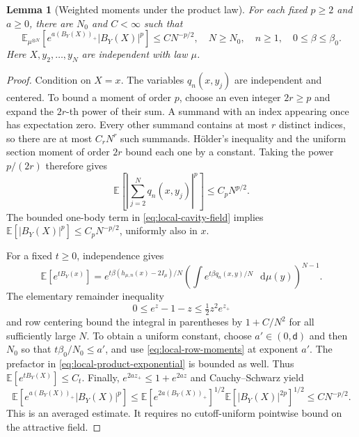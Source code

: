 \documentclass[11pt,reqno]{amsart}
\numberwithin{equation}{section}
\theoremstyle{plain}
\newtheorem{lemma}[lemma]{Lemma}
\theoremstyle{definition}
\renewcommand{\d}{\mathsf d}
\newcommand{\dd}{\mathop{}\!\mathrm d}
\newcommand{\E}{\mathbb E}
\newcommand{\be}{\beta}
\begin{document}
\begin{lemma}[Weighted moments under the product law]
\label{lem:local-product-moments}
For each fixed $p\geq2$ and $a\geq0$, there are $N_0$ and $C<\infty$ such that
\begin{equation}
 \E_{\mu^{\otimes N}}\!\left[e^{a(B_Y(X))_+}|B_Y(X)|^p\right]
 \leq C N^{-p/2},
 \quad N\geq N_0,\quad n\geq1,\quad 0\leq\be\leq\be_0.
 \label{eq:local-weighted-product-moments}
\end{equation}
Here $X,y_2,\ldots,y_N$ are independent with law $\mu$.
\end{lemma}
\begin{proof}
Condition on $X=x$. The variables $q_n(x,y_j)$ are independent and centered. To bound a moment of order $p$, choose an even integer $2r\geq p$ and expand the $2r$-th power of their sum. A summand with an index appearing once has expectation zero. Every other summand contains at most $r$ distinct indices, so there are at most $C_rN^r$ such summands. H\"older's inequality and the uniform section moment of order $2r$ bound each one by a constant. Taking the power $p/(2r)$ therefore gives
\begin{equation}
 \E\!\left[\left|\sum_{j=2}^Nq_n(x,y_j)\right|^p\right]
 \leq C_pN^{p/2}.
 \label{eq:local-centered-sum-moments}
\end{equation}
The bounded one-body term in \eqref{eq:local-cavity-field} implies $\E[|B_Y(X)|^p]\leq C_pN^{-p/2}$, uniformly also in $x$.

For a fixed $t\geq0$, independence gives
\begin{equation}
 \E[e^{tB_Y(x)}]
 =e^{t\be(h_{\mu,n}(x)-2I_\mu)/N}
 \left(\int e^{t\be q_n(x,y)/N}\,\dd\mu(y)\right)^{N-1}.
 \label{eq:local-product-exponential}
\end{equation}
The elementary remainder inequality
\begin{equation}
 0\leq e^z-1-z\leq\tfrac12 z^2e^{z_+}
 \label{eq:local-exponential-remainder}
\end{equation}
and row centering bound the integral in parentheses by $1+C/N^2$ for all sufficiently large $N$. To obtain a uniform constant, choose $a'\in(0,\d)$ and then $N_0$ so that $t\be_0/N_0\leq a'$, and use \eqref{eq:local-row-moments} at exponent $a'$. The prefactor in \eqref{eq:local-product-exponential} is bounded as well. Thus $\E[e^{tB_Y(X)}]\leq C_t$. Finally, $e^{2az_+}\leq1+e^{2az}$ and Cauchy--Schwarz yield
\begin{equation}
 \E[e^{a(B_Y(X))_+}|B_Y(X)|^p]
 \leq\E[e^{2a(B_Y(X))_+}]^{1/2}
      \E[|B_Y(X)|^{2p}]^{1/2}
 \leq C N^{-p/2}.
 \label{eq:local-weighted-product-closure}
\end{equation}
This is an averaged estimate. It requires no cutoff-uniform pointwise bound on the attractive field.
\end{proof}
\end{document}
